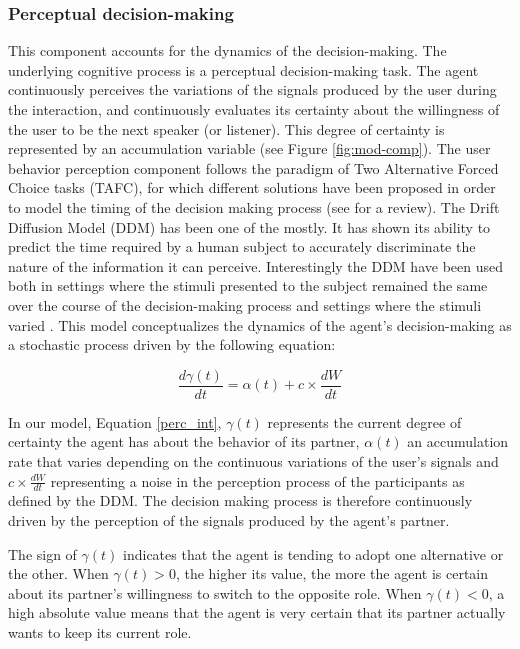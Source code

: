 \subsubsection{Perceptual decision-making}

This component accounts for the dynamics of the decision-making. The underlying cognitive process is a perceptual decision-making task. The agent continuously perceives the variations of the signals produced by the user during the interaction, and continuously evaluates its certainty about the willingness of the user to be the next speaker (or listener). This degree of certainty is represented by an accumulation variable (see Figure \ref{fig:mod-comp}).
The user behavior perception component follows the paradigm of Two Alternative Forced Choice tasks (TAFC), for which different solutions have been proposed in order to model the timing of the decision making process (see \citep{bogacz_physics_2006} for a review). 
The Drift Diffusion Model (DDM) has been one of the mostly. It has shown its ability to predict the time required by a human subject to accurately discriminate the nature of the information it can perceive. 
Interestingly the DDM have been used both in settings where the stimuli presented to the subject remained the same over the course of the decision-making process and settings where the stimuli varied \cite{ratcliff_note_1980}. This model conceptualizes the dynamics of the agent's decision-making as a stochastic process driven by the following equation:

\begin{equation}
  \frac{d\gamma(t)}{dt}=\alpha(t)+c\times\frac{dW}{dt}
  \label{perc_int}
\end{equation}

In our model, Equation \ref{perc_int}, $\gamma(t)$ represents the current degree of certainty the agent has about the behavior of its partner, $\alpha(t)$ an accumulation rate that varies depending on the continuous variations of the user's signals and $c\times\frac{dW}{dt}$ representing a noise in the perception process of the participants as defined by the DDM. The decision making process is therefore continuously driven by the perception of the signals produced by the agent's partner.

The sign of $\gamma(t)$ indicates that the agent is tending to adopt one alternative or the other. 
When $\gamma(t)>0$, the higher its value, the more the agent is certain about its partner's willingness to switch to the opposite role.
When $\gamma(t)<0$, a high absolute value means that the agent is very certain that its partner actually wants to keep its current role. 

